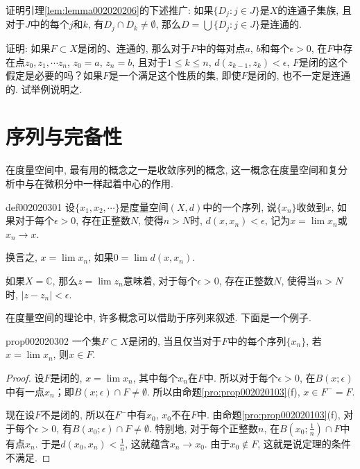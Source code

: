 \begin{exercise}\label{exer002020204}
证明引理\ref{lem:lemma002020206}的下述推广: 如果$\{D_j:j \in J\}$是$X$的连通子集族, 且对于$J$中的每个$j$和$k$, 有$D_j \cap D_k \neq \emptyset$, 那么$D = \bigcup\{D_j: j \in J\}$是连通的. 
\end{exercise}

\begin{exercise}\label{exer002020205}
证明: 如果$F \subset X$是闭的、连通的, 那么对于$F$中的每对点$a$, $b$和每个$\epsilon > 0$, 在$F$中存在点$z_0, z_1,\cdots z_n$, $z_0=a$, $z_n=b$, 且对于$1 \le k \le n$, $d(z_{k-1}, z_k) < \epsilon$, $F$是闭的这个假定是必要的吗？如果$F$是一个满足这个性质的集, 即使$F$是闭的, 也不一定是连通的. 试举例说明之. 
\end{exercise}


\section{序列与完备性}\label{section0020203}
在度量空间中, 最有用的概念之一是收敛序列的概念, 这一概念在度量空间和复分析中与在微积分中一样起着中心的作用. 

\begin{definition}{}{def002020301}
设$\{x_1,x_2,\cdots\}$是度量空间$(X,d)$中的一个序列, 说$\{x_n\}$收敛到$x$, 如果对于每个$\epsilon > 0$, 存在正整数$N$, 使得$n > N$时, $d(x, x_n) < \epsilon$, 记为$x = \lim{x_n}$或$x_n \to x$. 
\end{definition}

换言之, $x = \lim{x_n}$, 如果$0 = \lim{d(x, x_n)}$. 

如果$X = \mathbb{C}$, 那么$z = \lim{z_n}$意味着, 对于每个$\epsilon > 0$, 存在正整数$N$, 使得当$n > N$时, $|z - z_n| < \epsilon$. 

在度量空间的理论中, 许多概念可以借助于序列来叙述. 下面是一个例子. 

\begin{proposition}{}{prop002020302}
一个集$F \subset X$是闭的, 当且仅当对于$F$中的每个序列$\{x_n\}$, 若$x = \lim{x_n}$, 则$x \in F$. 
\end{proposition}

\begin{proof}
设$F$是闭的, $x = \lim{x_n}$, 其中每个$x_n$在$F$中. 所以对于每个$\epsilon > 0$, 在$B(x;\epsilon)$中有一点$x_n$；即$B(x;\epsilon) \cap F \neq \emptyset$. 所以由命题\ref{pro:prop002020103}(f), $x \in F^- = F$. 

现在设$F$不是闭的, 所以在$F^-$中有$x_0$, $x_0$不在$F$中. 由命题\ref{pro:prop002020103}(f), 对于每个$\epsilon > 0$, 有$B(x_0;\epsilon) \cap F \neq \emptyset$. 特别地, 对于每个正整数$n$, 在$B(x_0; \frac{1}{n}) \cap F$中有点$x_n$. 于是$d(x_0, x_n) < \frac{1}{n}$, 这就蕴含$x_n \to x_0$. 由于$x_0 \not\in F$, 这就是说定理的条件不满足. 
\end{proof}

